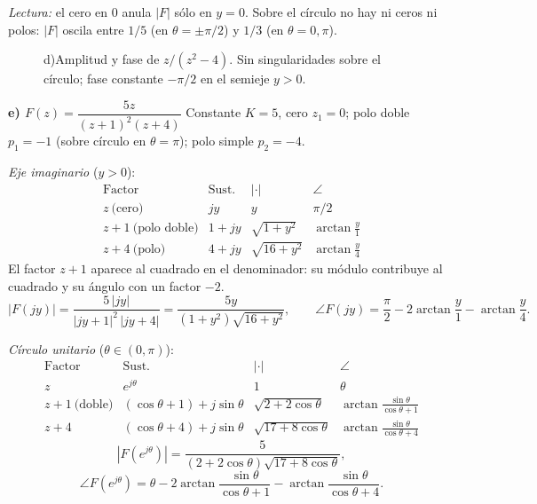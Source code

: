 \documentclass[10pt,a4paper]{article}
\begin{document}
\noindent\textit{Lectura:} el cero en $0$ anula $|F|$ sólo en $y=0$. Sobre el círculo no hay ni ceros ni polos: $|F|$ oscila entre $1/5$ (en $\theta=\pm\pi/2$) y $1/3$ (en $\theta=0,\pi$).

\begin{figure}[H]\centering
	
	\caption{d)\enspace Amplitud y fase de $z/(z^2-4)$. Sin singularidades sobre el círculo; fase constante $-\pi/2$ en el semieje $y>0$.}
	\label{fig:resp16d}
\end{figure}

\bigskip

\noindent\textbf{e) $F(z)=\dfrac{5z}{(z+1)^2(z+4)}$}\;\textemdash\; Constante $K=5$, cero $z_1=0$; polo doble $p_1=-1$ (sobre círculo en $\theta=\pi$); polo simple $p_2=-4$.

\medskip
\noindent\textit{Eje imaginario} ($y>0$):
\[
	\renewcommand{\arraystretch}{1.3}
	\begin{array}{l|c|c|c}
	\text{Factor} & \text{Sust.} & |\cdot| & \angle \\\hline
	z\ \text{(cero)}           & jy    & y             & \pi/2 \\
	z+1\ \text{(polo doble)}   & 1+jy  & \sqrt{1+y^2}  & \arctan\tfrac{y}{1} \\
	z+4\ \text{(polo)}         & 4+jy  & \sqrt{16+y^2} & \arctan\tfrac{y}{4}
	\end{array}
\]
El factor $z+1$ aparece al cuadrado en el denominador: su módulo contribuye al cuadrado y su ángulo con un factor $-2$.
\[
	|F(jy)| = \frac{5\,|jy|}{|jy+1|^2\,|jy+4|} = \frac{5y}{(1+y^2)\sqrt{16+y^2}},\qquad
	\angle F(jy) = \frac{\pi}{2} - 2\arctan\!\frac{y}{1} - \arctan\!\frac{y}{4}.
\]

\medskip
\noindent\textit{Círculo unitario} ($\theta\in(0,\pi)$):
\[
	\renewcommand{\arraystretch}{1.3}
	\begin{array}{l|c|c|c}
	\text{Factor} & \text{Sust.} & |\cdot| & \angle \\\hline
	z             & e^{j\theta}                & 1                     & \theta \\
	z+1\ \text{(doble)} & (\cos\theta+1)+j\sin\theta & \sqrt{2+2\cos\theta}  & \arctan\tfrac{\sin\theta}{\cos\theta+1} \\
	z+4           & (\cos\theta+4)+j\sin\theta & \sqrt{17+8\cos\theta} & \arctan\tfrac{\sin\theta}{\cos\theta+4}
	\end{array}
\]
\[
	|F(e^{j\theta})| = \frac{5}{(2+2\cos\theta)\sqrt{17+8\cos\theta}},
\]
\[
	\angle F(e^{j\theta}) = \theta - 2\arctan\!\frac{\sin\theta}{\cos\theta+1} - \arctan\!\frac{\sin\theta}{\cos\theta+4}.
\]
\end{document}
